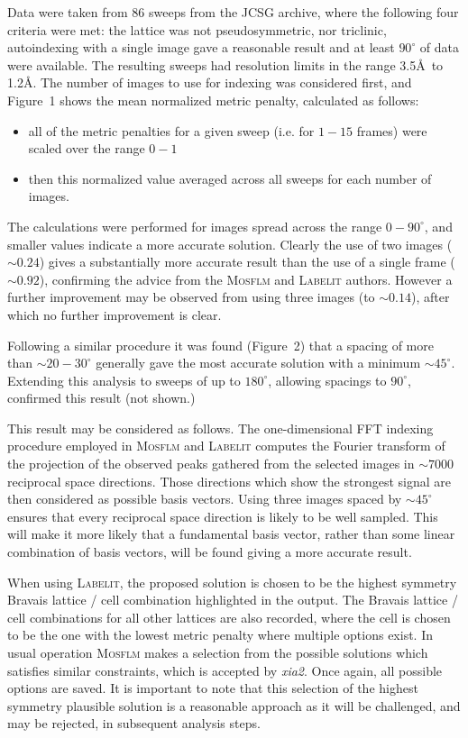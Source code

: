 \documentclass[preprint,pdf]{iucr}
\begin{document}
Data were taken from 86 sweeps from the JCSG archive, where  the
following four
criteria were met: the lattice was not pseudosymmetric, nor triclinic,
autoindexing with a single image gave a reasonable result and
at least $90^{\circ}$ of data were available. The resulting sweeps had 
resolution limits in the range 3.5\AA\ to 1.2\AA. The number of images
to use for indexing was considered first, and Figure~1
shows the mean normalized metric penalty, calculated as follows:

\begin{itemize}
\item{all of the metric penalties for a
  given sweep (i.e. for $1 - 15$ frames) were scaled over the range $0 - 1$}
\item{then this normalized
  value averaged across all sweeps for each number of images.}
\end{itemize}

\noindent
The calculations were performed for
images spread across the range $0 - 90^{\circ}$, and
smaller values indicate a more accurate solution. Clearly the use of
two images ($\sim 0.24$) gives a substantially more accurate result
than the use of a single frame ($\sim 0.92$), 
confirming the advice from the \textsc{Mosflm} and
\textsc{Labelit} authors. However a further improvement may be observed from
using three images (to $\sim 0.14$), after which no further
improvement is clear.  

Following a similar procedure it was found
(Figure~2) that a 
spacing of more than $\sim 20 - 30^{\circ}$ generally gave the most accurate
solution with a minimum $\sim 45^{\circ}$. 
Extending this analysis to sweeps of up to $180^{\circ}$, allowing
spacings to $90^{\circ}$,
confirmed this result (not shown.) 

This result may be considered as follows. The one-dimensional FFT
indexing procedure employed in \textsc{Mosflm} and \textsc{Labelit} computes the
Fourier transform of the projection of the observed peaks gathered
from the selected images in $\sim
7000$ reciprocal space directions. Those directions which show the
strongest signal are then considered as possible basis vectors. Using
three images spaced by $\sim 45^{\circ}$ ensures that every reciprocal
space direction is likely to be well sampled. This will make it more likely
that a fundamental basis vector, rather than some linear combination
of basis vectors, will be found giving a more accurate result.

When using \textsc{Labelit}, the proposed solution is chosen to be the highest symmetry
Bravais lattice / cell combination highlighted in the output. The
Bravais lattice / cell combinations for all other lattices are also
recorded, where the cell is chosen to be the one with the lowest
metric penalty where multiple options exist. In usual operation \textsc{Mosflm}
makes a selection from the possible solutions which satisfies similar
constraints, which is accepted by \emph{xia2}. Once again, all possible
options are saved. It is important to note that this selection of the
highest symmetry plausible solution is a reasonable approach as it will be
challenged, and may be rejected, in subsequent analysis steps.
\end{document}
